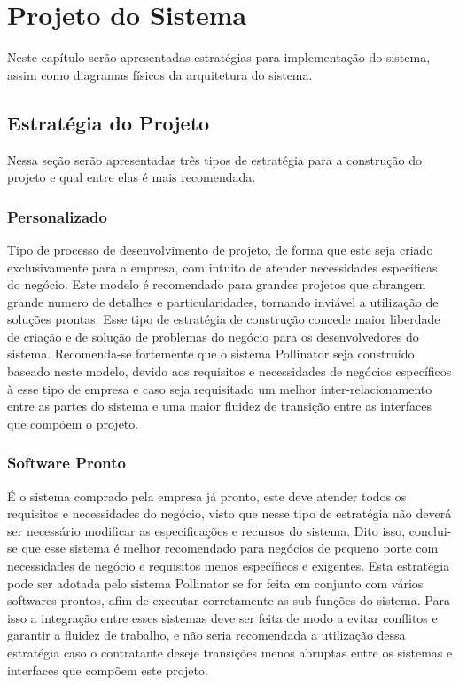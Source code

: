 
\chapter{Projeto do Sistema}

Neste capítulo serão apresentadas estratégias para implementação do sistema, assim como diagramas físicos da arquitetura do sistema.

\section{Estrat\'{e}gia do Projeto}

Nessa seção serão apresentadas três tipos de estratégia para a construção do projeto e qual entre elas é mais recomendada.
	
		\subsection{Personalizado}
			Tipo de processo de desenvolvimento de projeto, de forma que este seja criado exclusivamente para a empresa, com intuito de atender necessidades específicas do negócio. Este modelo é recomendado para grandes projetos que abrangem grande numero de detalhes e particularidades, tornando inviável a utilização de soluções prontas.
			Esse tipo de estratégia de construção concede maior liberdade de criação e de solução de problemas do negócio para os desenvolvedores do sistema.
			Recomenda-se fortemente que o sistema Pollinator seja construído baseado neste modelo, devido aos requisitos e necessidades de negócios específicos à esse tipo de empresa e caso seja requisitado um melhor inter-relacionamento entre as partes do sistema e uma maior fluidez de transição entre as interfaces que compõem o projeto.
		\subsection{Software Pronto}
			É o sistema comprado pela empresa já pronto, este deve atender todos os requisitos e necessidades do negócio, visto que nesse tipo de estratégia não deverá ser necessário modificar as especificações e recursos do sistema. Dito isso, conclui-se que esse sistema é melhor recomendado para negócios de pequeno porte com necessidades de negócio e requisitos menos específicos e exigentes.
			Esta estratégia pode ser adotada pelo sistema Pollinator se for feita em conjunto com vários softwares prontos, afim de executar corretamente as sub-funções do sistema. Para isso a integração entre esses sistemas deve ser feita de modo a evitar conflitos e garantir a fluidez de trabalho, e não seria recomendada a utilização dessa estratégia caso o contratante deseje transições menos abruptas entre os sistemas e interfaces que compõem este projeto.
